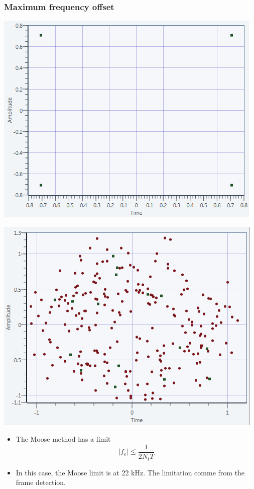 \documentclass[11pt]{beamer}
\begin{document}
\begin{frame}
\frametitle{Maximum frequency offset}
\begin{minipage}[b]{0.48\linewidth}
        \centering \includegraphics[scale=0.37]{img/Moose_Limit_10k.png}
    \end{minipage}\hfill
    \begin{minipage}[b]{0.48\linewidth}
         \centering \includegraphics[scale=0.37]{img/Moose_Limit_12k.png}
    \end{minipage}
\begin{itemize}
\item The Moose method has a limit 
\begin{equation}
|f_e| \leq \frac{1}{2N_tT}
\end{equation}
\item In this case, the Moose limit is at 22 kHz. The limitation comme from the frame detection.
\end{itemize}
\end{frame}
\end{document}
